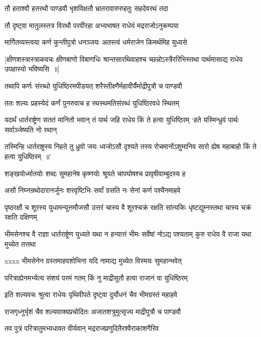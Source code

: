 \twolineshloka
{तौ हताश्वौ हतरथौ पाण्डवौ भृशविक्षतौ}
{भ्रातरावारुरुहतुः सहदेवरथं तदा}


\twolineshloka
{तौ दृष्ट्वा मातुलस्तत्र विरथौ परवीरहा}
{अभ्यभाषत राधेयं मद्रराजोऽनुकम्पया}


\twolineshloka
{मार्गितव्यस्त्वया कर्ण कुन्तीपुत्रो धनञ्जयः}
{अतस्त्वं धर्मराजेन किमर्थमिह युध्यसे}


\threelineshloka
{[क्षीणशस्त्रास्त्राकवचः क्षीणबाणो विबाणधिः}
{श्रान्तसारथिवाहश्च च्छन्नोऽस्त्रैररिभिस्तथा}
{पार्थमासाद्य राधेय उपहास्यो भविष्यसि ॥]}


\twolineshloka
{तथापि कर्णः संरब्धो युधिष्ठिरमपीडयत्}
{शरैस्तीक्ष्णैर्महावीर्यैर्माद्रीपुत्रौ च पाण्डवौ}


\twolineshloka
{ततः शल्यः प्रहस्येदं कर्णं पुनरुवाच ह}
{रथस्थमतिसंरब्धं युधिष्ठिरवधे स्थितम्}


\threelineshloka
{यदर्थं धार्तराष्ट्रेण सततं मानितो भवान्}
{तं पार्थ जहि राधेय किं ते हत्वा युधिष्ठिरम्}
{`हते यस्मिन्ध्रुवं पार्थः सर्वाञ्जेष्यति नो रथान्}


\threelineshloka
{तस्मिन्हि धार्तराष्ट्रस्य निहते तु ध्रुवो जयः}
{ध्वजोऽसौ दृश्यते तस्य रोचमानोंऽशुमानिव}
{सारो ह्येष महाबाहो किं ते हत्वा युधिष्ठिरम् ॥'}


\twolineshloka
{शङ्खयोर्ध्मातयोः शब्दः सुमहानेष कृष्णयोः}
{श्रूयते चापघोषश्च प्रावृषीवाम्बुदस्य ह}


\twolineshloka
{असौ निघ्नन्रथोदारानर्जुनः शरवृष्टिभिः}
{सर्वां ग्रसति नः सेनां कर्ण पश्यैनमाहवे}


पृष्ठरक्षौ च शूरस्य युधामन्यूत्तमौजसौ
\twolineshloka
{उत्तरं चास्य वै शूरश्चक्रं रक्षति सांत्यकिः}
{धृष्टद्युम्नस्तथा चास्य चक्रं रक्षति दक्षिणम्}


\threelineshloka
{भीमसेनश्च वै राज्ञा धार्तराष्ट्रेण युध्यते}
{यथा न हन्यात्तं भीमः सर्वेषां नोऽद्य पश्यताम्}
{कुरु राधेय वै राजा यथा मुच्येत तत्तथा}


\twolineshloka
{xxxx भीमसेनेन ग्रस्तमाहवशोभिना}
{यदि नामाद्य मुच्येत विस्मयः सुमहान्भवेत्}


\twolineshloka
{परित्राह्येनमभ्येत्य संशयं परमं गतम्}
{किं नु माद्रीसुतौ हत्वा राजानं वा युधिष्ठिरम्}


\twolineshloka
{इति शल्यवचः श्रुत्वा राधेयः पृथिवीपते}
{दृष्ट्वा दुर्योधनं चैव भीमग्रस्तं महाहवे}


\twolineshloka
{राजगृध्नुर्भृशं चैव शल्यवाक्यप्रचोदितः}
{अजातशत्रुमुत्सृज्य माद्रीपुत्रौ च पाण्डवौ}


\twolineshloka
{तव पुत्रं परित्रातुमभ्यधावत वीर्यवान्}
{मद्रराजप्रणुदितैरश्वैराकाशगैरिव}



